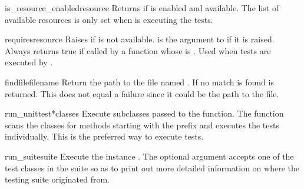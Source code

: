\begin{funcdesc}{is_resource_enabled}{resource}
Returns  if  is enabled and available.
The list of available resources is only set when 
is executing the tests.
\end{funcdesc}

\begin{funcdesc}{requires}{resource}
Raises  if  is not available.
 is the argument to  if it is raised.
Always returns true if called by a function whose  is
.
Used when tests are executed by .
\end{funcdesc}

\begin{funcdesc}{findfile}{filename}
Return the path to the file named .
If no match is found  is returned.
This does not equal a failure since it could be the path to the file.
\end{funcdesc}

\begin{funcdesc}{run_unittest}{*classes}
Execute  subclasses passed to the function.
The function scans the classes for methods starting with the prefix
 and executes the tests individually.
This is the preferred way to execute tests.
\end{funcdesc}

\begin{funcdesc}{run_suite}{suite}
Execute the  instance .
The optional argument  accepts one of the test classes in the
suite so as to print out more detailed information on where the testing suite
originated from.
\end{funcdesc}
